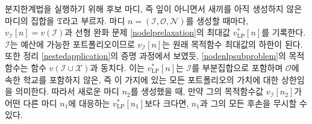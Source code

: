 \documentclass[11pt]{article} %
\newif\ifen
\theoremstyle{definition}
\theoremstyle{definition}
\begin{document}
\ifen
To implement the branch-and-bound algorithm, we represent the set of candidate nodes---namely, nonleaf nodes whose children have not yet been generated---by $\mathfrak{T}$. Each time a node $n= (\mathcal{I}, \mathcal{O}, \mathcal{N})$ is generated, we record the values $v_{\mathcal{I}}[n] = v(\mathcal{I})$ and $v^*_{\mathrm{LP}}[n]$, the optimal objective value of the LP relaxation \eqref{nodelprelaxation}. Because $\mathcal{I}$ is a feasible portfolio, $v_{\mathcal{I}}[n]$ is a lower bound on the optimal objective value. Moreover, by the argument given in the proof of Theorem \ref{nestedapplication}, the objective function of  \eqref{nodenlpsubproblem} is identical to the function $v(\mathcal{I} \cup \mathcal{X})$. This means that $v_{\mathrm{LP}}^*[n]$  is an upper bound on the valuation of any portfolio that contains $\mathcal{I}$ as a subset and does not include any school in $\mathcal{O}$, and hence on the valuation of any portfolio on this branch. Therefore, if upon generating a new node $n_2$, we discover that its objective value $v_{\mathcal{I}}[n_2]$ is greater than $v_{\mathrm{LP}}^*[n_1]$ for some other node $n_1$, then we can disregard $n_1$ and all its descendants. 
\else
분지한계법을 실행하기 위해 후보 마디, 즉 잎이 아니면서 새끼를 아직 생성하지 않은 마디의 집합을  $\mathfrak{T}$라고 부르자. 마디 $n= (\mathcal{I}, \mathcal{O}, \mathcal{N})$를 생성할 때마다, $v_{\mathcal{I}}[n] = v(\mathcal{I})$과 선형 완화 문제 \eqref{nodelprelaxation}의 최대값 $v^*_{\mathrm{LP}}[n]$를 기록한다. $\mathcal{I}$는 예산에 가능한 포트폴리오이므로 $v_{\mathcal{I}}[n]$는 원래 목적함수 최대값의 하한이 된다. 또한 정리 \ref{nestedapplication}의 증명 과정에서 보였듯, \eqref{nodenlpsubproblem}의 목적함수는 함수 $v(\mathcal{I} \cup \mathcal{X})$과 동치다. 이는 $v_{\mathrm{LP}}^*[n]$는 $\mathcal{I}$를 부분집합으로 포함하며 $\mathcal{O}$에 속한 학교를 포함하지 않은, 즉 이 가지에 있는 모든 포트폴리오의 가치에 대한 상한임을 의미한다. 따라서 새로운 마디 $n_2$를 생성했을 때, 만약 그의 목적함수값 $v_{\mathcal{I}}[n_2]$가 어떤 다른 마디 $n_1$에 대응하는 $v_{\mathrm{LP}}^*[n_1]$보다 크다면, $n_1$과 그의 모든 후손을 무시할 수 있다.
\fi
\end{document}
